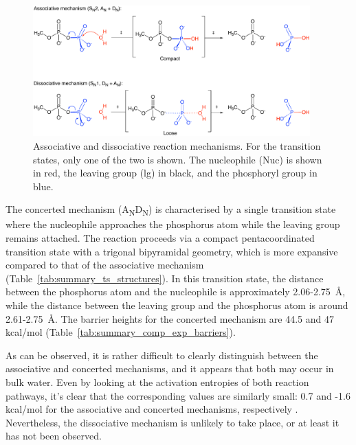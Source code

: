 \begin{figure}[t!]
    \centering
    \includegraphics[width=0.95\textwidth]{Figures/1_Introduction/intro_reaction_mechanism.pdf}
    \caption{Associative and dissociative reaction mechanisms. For the transition states, only one of the two is shown. The nucleophile (Nuc) is shown in red, the leaving group (lg) in black, and the phosphoryl group in blue.}
    \label{fig:reaction-mechanism}
\end{figure}

The concerted mechanism (A\textsubscript{N}D\textsubscript{N}) is characterised by a single transition state \; where the nucleophile approaches the phosphorus atom while the leaving group remains attached. The reaction proceeds via a compact pentacoordinated transition state with a trigonal bipyramidal geometry, which is more expansive compared to that of the associative mechanism (Table~\ref{tab:summary_ts_structures}). In this transition state, the distance between the phosphorus atom and the nucleophile is approximately 2.06-2.75~\AA, while the distance between the leaving group and the phosphorus atom is around 2.61-2.75~\AA. The barrier heights for the concerted mechanism are 44.5 and 47 kcal/mol (Table~\ref{tab:summary_comp_exp_barriers}).

As can be observed, it is rather difficult to clearly distinguish between the associative and concerted mechanisms, and it appears that both may occur in bulk water. Even by looking at the activation entropies of both reaction pathways, it's clear that the corresponding values are similarly small: 0.7 and -1.6 kcal/mol for the associative and concerted mechanisms, respectively \citep{duarteResolvingApparentConflicts2015}.  Nevertheless, the dissociative mechanism is unlikely to take place, or at least it has not been observed.



